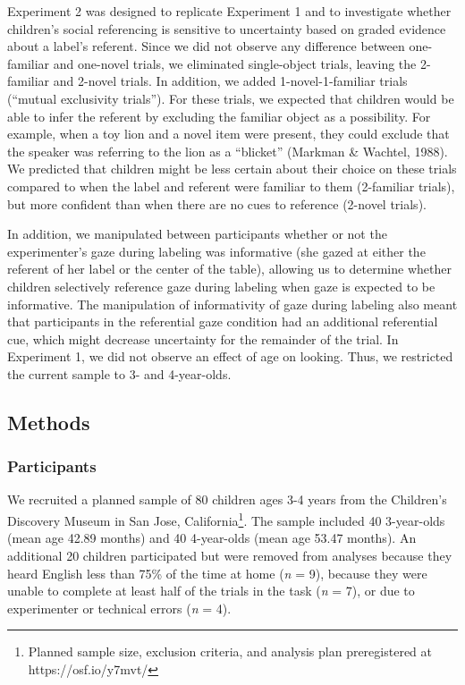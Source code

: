 \documentclass[10pt, letterpaper]{article}
\begin{document}
Experiment 2 was designed to replicate Experiment 1 and to investigate
whether children's social referencing is sensitive to uncertainty based
on graded evidence about a label's referent. Since we did not observe
any difference between one-familiar and one-novel trials, we eliminated
single-object trials, leaving the 2-familiar and 2-novel trials. In
addition, we added 1-novel-1-familiar trials (``mutual exclusivity
trials''). For these trials, we expected that children would be able to
infer the referent by excluding the familiar object as a possibility.
For example, when a toy lion and a novel item were present, they could
exclude that the speaker was referring to the lion as a ``blicket''
(Markman \& Wachtel, 1988). We predicted that children might be less
certain about their choice on these trials compared to when the label
and referent were familiar to them (2-familiar trials), but more
confident than when there are no cues to reference (2-novel trials).

In addition, we manipulated between participants whether or not the
experimenter's gaze during labeling was informative (she gazed at either
the referent of her label or the center of the table), allowing us to
determine whether children selectively reference gaze during labeling
when gaze is expected to be informative. The manipulation of
informativity of gaze during labeling also meant that participants in
the referential gaze condition had an additional referential cue, which
might decrease uncertainty for the remainder of the trial. In Experiment
1, we did not observe an effect of age on looking. Thus, we restricted
the current sample to 3- and 4-year-olds.

\subsection{Methods}\label{methods-1}

\subsubsection{Participants}\label{participants-1}

We recruited a planned sample of 80 children ages 3-4 years from the
Children's Discovery Museum in San Jose,
California\footnote{Planned sample size, exclusion criteria, and analysis plan preregistered at https://osf.io/y7mvt/}.
The sample included 40 3-year-olds (mean age 42.89 months) and 40
4-year-olds (mean age 53.47 months). An additional 20 children
participated but were removed from analyses because they heard English
less than 75\% of the time at home (\emph{n} = 9), because they were
unable to complete at least half of the trials in the task (\emph{n} =
7), or due to experimenter or technical errors (\emph{n} = 4).
\end{document}
